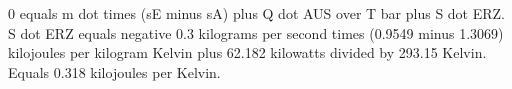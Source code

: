 0 equals m dot times (sE minus sA) plus Q dot AUS over T bar plus S dot ERZ.  
S dot ERZ equals negative 0.3 kilograms per second times (0.9549 minus 1.3069) kilojoules per kilogram Kelvin plus 62.182 kilowatts divided by 293.15 Kelvin.  
Equals 0.318 kilojoules per Kelvin.